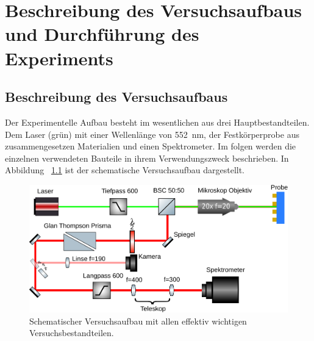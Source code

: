 \chapter{Beschreibung des Versuchsaufbaus und Durchführung des Experiments}

\section{Beschreibung des Versuchsaufbaus}
\label{sec:Beschreibung des Versuchsaufbaus}
Der Experimentelle Aufbau besteht im wesentlichen aus drei Hauptbestandteilen.
Dem Laser (grün) mit einer Wellenlänge von \SI{552}{\nano\meter}, der Festkörperprobe aus zusammengesetzen
Materialien und einen Spektrometer.
Im folgen werden die einzelnen verwendeten Bauteile in ihrem Verwendungszweck beschrieben.
In Abbildung ~\ref{fig:aufbau} ist der schematische Versuchsaufbau dargestellt.
\begin{figure}
    \centering
    \includegraphics[scale=0.75]{./Plots/setup.pdf}
    \caption{Schematischer Versuchsaufbau mit allen effektiv wichtigen Versuchsbestandteilen.}
    \label{fig:aufbau}
\end{figure}
\FloatBarrier

